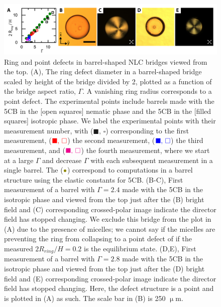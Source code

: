 \begin{figure}
  \centering
  \includegraphics{figures/C5/Ch5-Figs_ExpBarrelRing.png}
  \caption{Ring and point defects in barrel-shaped NLC bridges viewed from the top.
  (A), The ring defect diameter in a barrel-shaped bridge scaled by height of the bridge divided by 2, plotted as a function of the bridge aspect ratio, $\Gamma$.
  A vanishing ring radius corresponds to a point defect.
  The experimental points include barrels made with the 5CB in the [open squares] nematic phase and the 5CB in the [filled squares] isotropic phase.
  We label the experimental points with their measurement number, with (${\blacksquare,\, \square}$) corresponding to the first measurement, (${\color{red} \blacksquare,\, \square}$) the second measurement, (${\color{blue} \blacksquare,\, \square}$) the third measurement, and (${\color{magenta} \blacksquare,\, \square}$) the fourth measurement, where we start at a large $\Gamma$ and decrease $\Gamma$ with each subsequent measurement in a single barrel.
  The (${\color{olive} \bullet}$) correspond to computations in a barrel structure using the elastic constants for 5CB.\@
  (B-C), First measurement of a barrel with $\Gamma = 2.4$ made with the 5CB in the isotropic phase and viewed from the top just after the (B) bright field and (C) corresponding crossed-polar image indicate the director field has stopped changing.
  We exclude this bridge from the plot in (A) due to the presence of micelles; we cannot say if the micelles are preventing the ring from collapsing to a point defect of if the measured $2 R_{ring}/H = 0.2$ is the equilibrium state.
  (D,E), First measurement of a barrel with $\Gamma = 2.8$ made with the 5CB in the isotropic phase and viewed from the top just after the (D) bright field and (E) corresponding crossed-polar image indicate the director field has stopped changing.
  Here, the defect structure is a point and is plotted in (A) as such.
  The scale bar in (B) is 250 $\upmu$m.}\label{f:5-ExpBarrelRing}
\end{figure}




